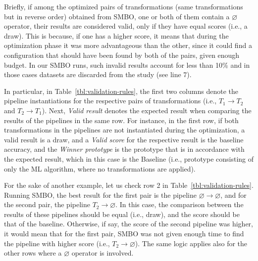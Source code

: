 Briefly, if among the optimized pairs of transformations (same transformations but in reverse order) obtained from SMBO, one or both of them contain a $\varnothing$ operator, their results are considered valid, only if they have equal scores (i.e., a draw). This is because, if one has a higher score, it means that during the optimization phase it was more advantageous than the other, since it could find a configuration that should have been found by both of the pairs, given enough budget. In our SMBO runs, such invalid results account for less than 10\% and in those cases datasets are discarded from the study (see line 7). 

In particular, in Table~\ref{tbl:validation-rules}, the first two columns denote the pipeline instantiations for the respective pairs of transformations (i.e., $T_1\rightarrow T_2$ and $T_2\rightarrow T_1$). Next, \textit{Valid result} denotes the expected result when comparing the results of the pipelines in the same row. For instance, in the first row, if both transformations in the pipelines are not instantiated during the optimization, a valid result is a draw, and a \textit{Valid score} for the respective result is the baseline accuracy, and the \textit{Winner prototype} is the prototype that is in accordance with the expected result, which in this case is the Baseline (i.e., prototype consisting of only the ML algorithm, where no transformations are applied).

For the sake of another example, let us check row 2 in Table~\ref{tbl:validation-rules}. Running SMBO, the best result for the first pair is the pipeline $\varnothing \rightarrow \varnothing$, and for the second pair, the pipeline $T_2 \rightarrow \varnothing$. In this case, the comparison between the results of these pipelines should be equal (i.e., draw), and the score should be that of the baseline. Otherwise, if say, the score of the second pipeline was higher, it would mean that for the first pair, SMBO was not given enough time to find the pipeline with higher score (i.e., $T_2\rightarrow \varnothing$).
The same logic applies also for the other rows where a $\varnothing$ operator is involved.

\color{black}

